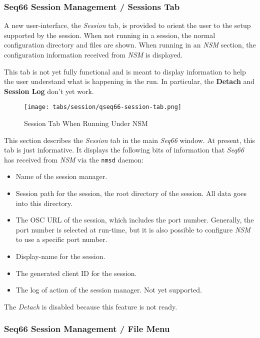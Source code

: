 \subsubsection{Seq66 Session Management / Sessions Tab}
\label{subsubsec:sessions_tab}

   A new user-interface, the \textsl{Session} tab, is provided to orient the
   user to the setup supported by the session.
   When not running in a session, the normal configuration directory and files
   are shown.  When running in an \textsl{NSM} section, the configuration
   information received from \textsl{NSM} is displayed.

   This tab is not yet fully functional and is meant to display information to
   help the user understand what is happening in the run.  In particular, the
   \textbf{Detach} and \textbf{Session Log} don't yet work.

\begin{figure}[H]
   \centering 
   \texttt{[image: tabs/session/qseq66-session-tab.png]}
   \caption*{Session Tab When Running Under NSM}
\end{figure}

   This section describes the \textsl{Session} tab in the main
   \textsl{Seq66} window.  At present, this tab is just informative.  It
   displays the following bits of information that \textsl{Seq66} has received
   from \textsl{NSM} via the \texttt{nmsd} daemon:

   \begin{itemize}
      \item Name of the session manager.
      \item Session path for the session, the root directory of the session.
         All data goes into this directory.
      \item The OSC URL of the session, which includes the port number.
         Generally, the port number is selected at run-time, but it is also
         possible to configure \textsl{NSM} to use a specific port number.
      \item Display-name for the session.
      \item The generated client ID for the session.
      \item The log of action of the session manager. Not yet supported.
   \end{itemize}

   The \textsl{Detach} is disabled because this feature is not ready.

\subsubsection{Seq66 Session Management / File Menu}
\label{subsubsec:sessions_file_menu}


